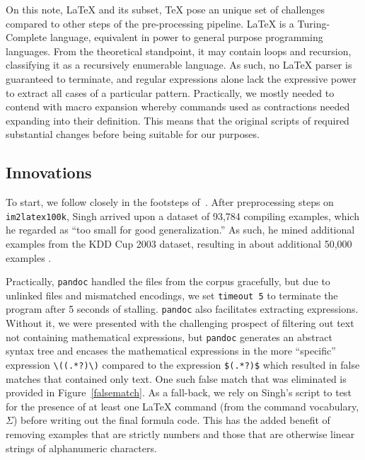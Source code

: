\documentclass{article}
\begin{document}
On this note, \LaTeX{} and its subset, \TeX{} pose an unique set of challenges
compared to other steps of the pre-processing pipeline. \LaTeX{} is a
Turing-Complete language, equivalent in power to general purpose programming
languages. From the theoretical standpoint, it may contain loops and recursion,
classifying it as a recursively enumerable language. As such, no \LaTeX{} parser
is guaranteed to terminate, and regular expressions alone lack the expressive
power to extract all cases of a particular pattern. Practically, we mostly
needed to contend with macro expansion whereby commands used as contractions
needed expanding into their definition. This means that the original scripts of
\cite{deng2016you} required substantial changes before being suitable for our
purposes.

\subsection{Innovations}
\label{datainnov}

To start, we follow closely in the footsteps of~\citeauthor{singh2018teaching}. After
preprocessing steps on \texttt{im2latex100k}, Singh arrived upon a dataset of
93,784 compiling examples, which he regarded as ``too small for good
generalization.'' As such, he mined additional examples from the KDD Cup 2003
dataset, resulting in about additional 50,000 examples
\parencite[8]{singh2018teaching}.  %

Practically, \texttt{pandoc} handled the files from the corpus gracefully, but
due to unlinked files and mismatched encodings, we set \texttt{timeout 5} to
terminate the program after 5 seconds of stalling. \texttt{pandoc} also
facilitates extracting expressions. Without it, we were presented with the
challenging prospect of filtering out text not containing mathematical
expressions, but \texttt{pandoc} generates an abstract syntax tree and encases
the mathematical expressions in the more ``specific'' expression
\verb|\((.*?)\)| compared to the expression \texttt{\$(.*?)\$} which resulted in
false matches that contained only text. One such false match that was eliminated
is provided in Figure~\ref{falsematch}. As a fall-back, we rely on Singh's script to test
for the presence of at least one \LaTeX{} command (from the command vocabulary,
$\Sigma$) before writing out the final formula code. This has the added benefit
of removing examples that are strictly numbers and those that are otherwise
linear strings of alphanumeric characters.
\end{document}
